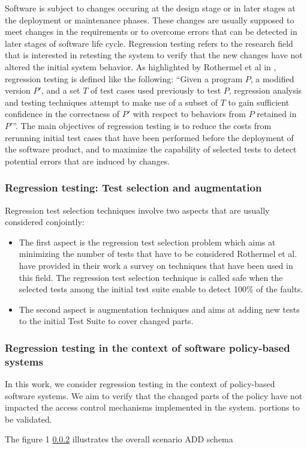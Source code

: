 Software is subject to changes occuring at the design stage or in later stages at the deployment or maintenance phases. These changes are 
usually supposed to meet changes in the requirements or to overcome errors that can be detected in later stages of software life cycle. 
Regression testing refers to the research field that is interested in retesting the system to verify that the new changes have not altered 
the initial system behavior. As highlighted by Rothermel et al in \cite{Rothermel:1996:ART:235681.235682}, regression testing is defined like the following: 
``Given a program $P$, a modified version $P'$, and a set $T$ of test cases used previously to test $P$, regression analysis and testing 
techniques attempt to make use of a subset of $T$ to gain sufficient confidence in the correctness of $P'$ with respect to behaviors from $P$ retained in $P'$''.
The main objectives of regression testing is to reduce the costs from rerunning initial test cases that have been performed before the deployment 
of the software product, and to maximize the capability of selected tests to detect potential errors that are induced by changes.


\subsubsection{Regression testing: Test selection and augmentation}
Regression test selection techniques involve two aspects that are usually considered conjointly:
\begin{itemize}
\item The first aspect is the regression test selection problem which aims at minimizing the number of tests that have to be considered 
Rothermel et al. \cite{Rothermel:1996:ART:235681.235682} have provided in their work a survey on techniques that have been used in this field. 
The regression test selection technique is called safe when the selected tests among the initial test suite enable to detect 100\% of the faults.
\item The second aspect is augmentation techniques and aims at adding new tests to the initial Test Suite to cover changed parts.
\end{itemize}

\subsubsection{Regression testing in the context of software policy-based systems}

In this work, we consider regression testing in the context of policy-based software systems. We aim to verify that the changed parts of the policy have not 
impacted the access control mechanisms implemented in the system.
 portions to be validated.




The figure 1 \ref {} illustrates the overall scenario
ADD schema





